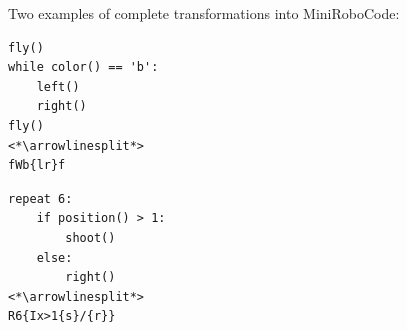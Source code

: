 \smallskip

\noindent
Two examples of complete transformations into MiniRoboCode:
\smallskip

\noindent\begin{minipage}{.49\textwidth}
\begin{lstlisting}[numbers=none]
fly()
while color() == 'b':
    left()
    right()
fly()
<*\arrowlinesplit*>
fWb{lr}f
\end{lstlisting}
\end{minipage}\hfill
\begin{minipage}{.49\textwidth}
\begin{lstlisting}[numbers=none]
repeat 6:
    if position() > 1:
        shoot()
    else:
        right()
<*\arrowlinesplit*>
R6{Ix>1{s}/{r}}
\end{lstlisting}
\end{minipage}
\smallskip


